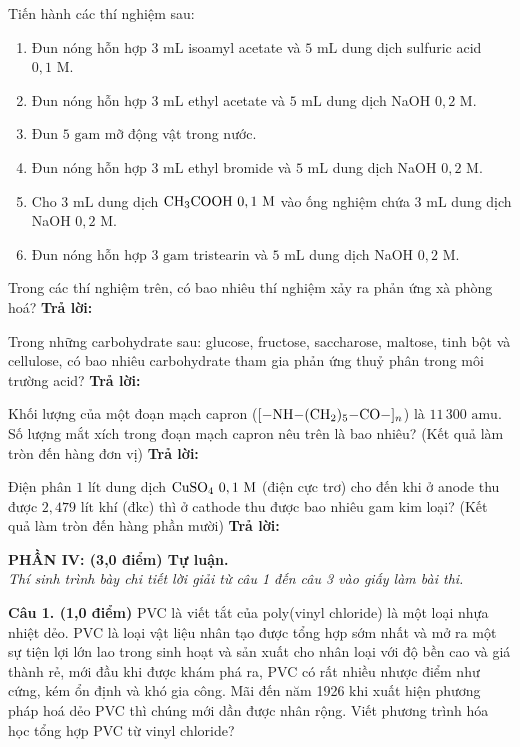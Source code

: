 \documentclass[11pt,a4paper]{article}
\begin{document}
\begin{ex}
Tiến hành các thí nghiệm sau:
\begin{enumerate}[label=(\arabic*),leftmargin=20pt,itemsep=1pt]
\item Đun nóng hỗn hợp $3\text{ mL}$ isoamyl acetate và $5\text{ mL}$ dung dịch sulfuric acid $0,1\text{ M}$.
\item Đun nóng hỗn hợp $3\text{ mL}$ ethyl acetate và $5\text{ mL}$ dung dịch NaOH $0,2\text{ M}$.
\item Đun $5\text{ gam}$ mỡ động vật trong nước.
\item Đun nóng hỗn hợp $3\text{ mL}$ ethyl bromide và $5\text{ mL}$ dung dịch NaOH $0,2\text{ M}$.
\item Cho $3\text{ mL}$ dung dịch $\ce{CH3COOH}\ 0,1\text{ M}$ vào ống nghiệm chứa $3\text{ mL}$ dung dịch NaOH $0,2\text{ M}$.
\item Đun nóng hỗn hợp $3\text{ gam}$ tristearin và $5\text{ mL}$ dung dịch NaOH $0,2\text{ M}$.
\end{enumerate}
Trong các thí nghiệm trên, có bao nhiêu thí nghiệm xảy ra phản ứng xà phòng hoá?
\hfill \textbf{Trả lời:} \dotfill
\end{ex}
\begin{ex}
Trong những carbohydrate sau: glucose, fructose, saccharose, maltose, tinh bột và cellulose, có bao nhiêu carbohydrate tham gia phản ứng thuỷ phân trong môi trường acid?
\hfill \textbf{Trả lời:} \dotfill
\end{ex}
\begin{ex}
Khối lượng của một đoạn mạch capron ($\ce{[-NH-(CH2)5-CO-]_n}$) là $11\,300\text{ amu}$. Số lượng mắt xích trong đoạn mạch capron nêu trên là bao nhiêu? (Kết quả làm tròn đến hàng đơn vị)
\hfill \textbf{Trả lời:} \dotfill
\end{ex}
\begin{ex}
Điện phân $1\text{ lít}$ dung dịch $\ce{CuSO4}\ 0,1\text{ M}$ (điện cực trơ) cho đến khi ở anode thu được $2,479\text{ lít}$ khí (đkc) thì ở cathode thu được bao nhiêu gam kim loại? (Kết quả làm tròn đến hàng phần mười)
\hfill \textbf{Trả lời:} \dotfill
\end{ex}
\vspace{4pt}
\noindent
{\color{mainGreen}\textbf{\large PHẦN IV: (3,0 điểm) Tự luận.}}\\
\textit{\small Thí sinh trình bày chi tiết lời giải từ câu 1 đến câu 3 vào giấy làm bài thi.}
\vspace{3pt}

\noindent
\textbf{Câu 1. (1,0 điểm)} PVC là viết tắt của poly(vinyl chloride) là một loại nhựa nhiệt dẻo. PVC là loại vật liệu nhân tạo được tổng hợp sớm nhất và mở ra một sự tiện lợi lớn lao trong sinh hoạt và sản xuất cho nhân loại với độ bền cao và giá thành rẻ, mới đầu khi được khám phá ra, PVC có rất nhiều nhược điểm như cứng, kém ổn định và khó gia công. Mãi đến năm 1926 khi xuất hiện phương pháp hoá dẻo PVC thì chúng mới dần được nhân rộng. Viết phương trình hóa học tổng hợp PVC từ vinyl chloride?
\end{document}
